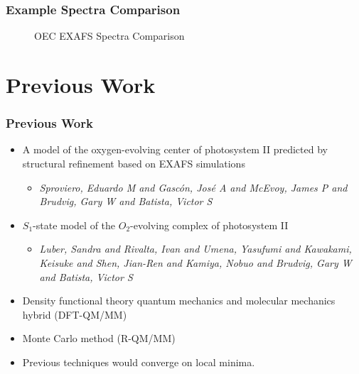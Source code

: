 \documentclass[10pt]{beamer}
\begin{document}
\begin{frame}
	\frametitle{Example Spectra Comparison}

	\begin{figure}
		\caption{OEC EXAFS Spectra Comparison}
	\end{figure}

\end{frame}

\section{Previous Work}

\begin{frame}
	\frametitle{Previous Work}

	\begin{itemize}
		\item A model of the oxygen-evolving center of photosystem II predicted by structural refinement based on EXAFS simulations
			\begin{itemize}
				\item \textit{Sproviero, Eduardo M and Gasc{\'o}n, Jos{\'e} A and McEvoy, James P and Brudvig, Gary W and Batista, Victor S}
			\end{itemize}
		\item $S_{1}$-state model of the $O_{2}$-evolving complex of photosystem II
			\begin{itemize}
				\item \textit{Luber, Sandra and Rivalta, Ivan and Umena, Yasufumi and Kawakami, Keisuke and Shen, Jian-Ren and Kamiya, Nobuo and Brudvig, Gary W and Batista, Victor S}
			\end{itemize}
		\item Density functional theory quantum mechanics and molecular mechanics hybrid (DFT-QM/MM)
		\item Monte Carlo method (R-QM/MM)
		\item Previous techniques would converge on local minima.
	\end{itemize}

\end{frame}
\end{document}
